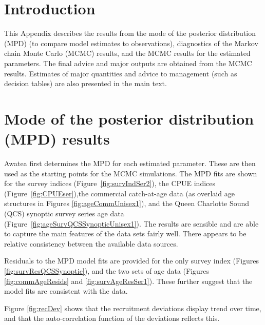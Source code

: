 
\section{Introduction}

This Appendix describes the results from the mode of the posterior distribution (MPD) (to compare model estimates to observations), diagnostics of the Markov chain Monte Carlo (MCMC) results, and the MCMC results for the estimated parameters.  The final advice and major outputs are obtained from the MCMC results. Estimates of major quantities and advice to management (such as decision tables) are also presented in the main text.


\section{Mode of the posterior distribution (MPD) results}

Awatea first determines the MPD for each estimated parameter.  These are then used as the starting points for the MCMC simulations. The MPD fits are shown for the survey indices (Figure~\ref{fig:survIndSer2}), the CPUE indices (Figure~\ref{fig:CPUEser}),the commercial catch-at-age data (as overlaid age structures in Figures \ref{fig:ageCommUnisex1}), and the Queen Charlotte Sound (QCS) synoptic survey series age data (Figure~\ref{fig:ageSurvQCSSynopticUnisex1}). The results are sensible and are able to capture the main features of the data sets fairly well. There appears to be relative consistency between the available data sources.

Residuals to the MPD model fits are provided for the only survey index (Figures \ref{fig:survResQCSSynoptic}), and the two sets of age data (Figures \ref{fig:commAgeResids} and \ref{fig:survAgeResSer1}). These further suggest that the model fits are consistent with the data.

Figure \ref{fig:recDev} shows that the recruitment deviations display trend over time, and that the auto-correlation function of the deviations reflects this.


